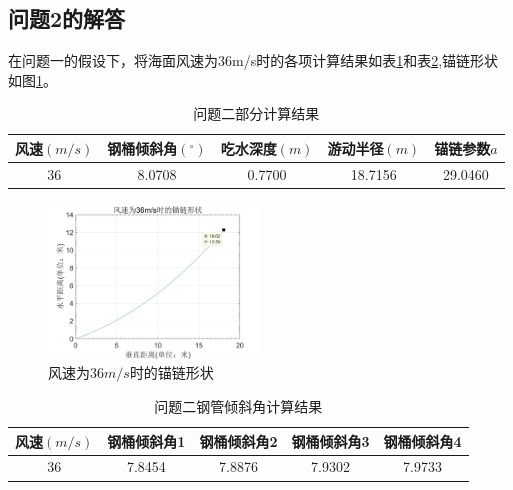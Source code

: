 \documentclass{cumcm}
\begin{document}
\subsection{问题2的解答}
在问题一的假设下，将海面风速为36m/s时的各项计算结果如表\ref{table:result_2}和表\ref{table:pipe_angle_2},锚链形状如图\ref{fig:chain_shape_36}。
\begin{table}[!htp]
	\centering
	\caption{问题二部分计算结果}\label{table:result_2}
	\centering
	\begin{tabular*}{\textwidth}{ccccc}
		
		\hline
		风速$(m/s)$ & 钢桶倾斜角$(^\circ)$ & 吃水深度$(m)$ & 游动半径$(m)$ & 锚链参数$a$\\
		\hline
		36 & 8.0708 & 0.7700 & 18.7156  & 29.0460\\
		\hline
	\end{tabular*}
\end{table}
\begin{figure}[H]
	\centering
	\includegraphics*[width=0.5\textwidth]{img/36mschainfigure.jpg}
	\caption{风速为36$m/s$时的锚链形状}
	\label{fig:chain_shape_36}
\end{figure}
\begin{table}[H]
	\centering
	\caption{问题二钢管倾斜角计算结果}
	\label{table:pipe_angle_2}
	\begin{tabular*}{0.85\textwidth}{ccccc}
		\hline
		风速$(m/s)$ & 钢桶倾斜角1 & 钢桶倾斜角2 & 钢桶倾斜角3 & 钢桶倾斜角4\\
		\hline
		36 & 7.8454 & 7.8876 & 7.9302 & 7.9733\\
		\hline
	\end{tabular*}
\end{table}
\end{document}
